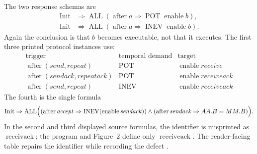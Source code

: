 The two response schemas are
\[
\begin{aligned}
\operatorname{Init}&\Rightarrow
 \operatorname{ALL}(\operatorname{after}a\Rightarrow
   \operatorname{POT}\operatorname{enable}b),\\
\operatorname{Init}&\Rightarrow
 \operatorname{ALL}(\operatorname{after}a\Rightarrow
   \operatorname{INEV}\operatorname{enable}b).
\end{aligned}
\]
Again the conclusion is that \(b\) becomes executable, not that it executes.
The first three printed protocol instances use:
\[
\begin{array}{c|c|c}
\text{trigger}&\text{temporal demand}&\text{target}\\ \hline
\operatorname{after}(\mathit{send},\mathit{repeat})&\operatorname{POT}
  &\operatorname{enable}\mathit{receive}\\
\operatorname{after}(\mathit{sendack},\mathit{repeatack})&\operatorname{POT}
  &\operatorname{enable}\mathit{receiveack}\\
\operatorname{after}(\mathit{send},\mathit{repeat})&\operatorname{INEV}
  &\operatorname{enable}\mathit{receiveack}
\end{array}
\]
The fourth is the single formula
\[
 \operatorname{Init}\Rightarrow
 \operatorname{ALL}\Bigl(
   (\operatorname{after}\mathit{accept}\Rightarrow
     \operatorname{INEV}(\operatorname{enable}\mathit{sendack}))
   \land
   (\operatorname{after}\mathit{sendack}\Rightarrow AA.B=MM.B)
 \Bigr).
\]
In the second and third displayed source formulas, the identifier is
misprinted as \(\operatorname{receivack}\); the program and Figure~2 define
only \(\operatorname{receiveack}\).  The reader-facing table repairs the
identifier while recording the defect
\cite[pp.~345--347]{QueilleSifakis1982}.

